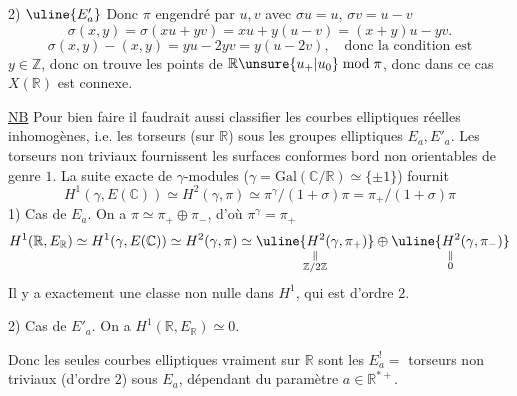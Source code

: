 2) $\uline{E'_a}$ Donc $\pi$ engendré par $u,v$ avec $\sigma u=u$, $\sigma v=u-v$
\[\sigma(x,y)=\sigma(xu+yv)=xu+y(u-v)=(x+y)u-yv.\]
\[\sigma(x,y)-(x,y)=yu-2yv=y(u-2v),\quad\text{donc la condition est}\]
$y\in\mathbb Z$, donc on trouve  les points de $\mathbb R\unsure{u_+|u_0}\bmod\pi$,
donc dans ce cas $X(\mathbb R)$ est connexe.

\uline{NB} Pour bien faire il faudrait aussi classifier les
courbes elliptiques réelles inhomogènes, i.e. les
torseurs (sur $\mathbb R$) sous les  groupes elliptiques
$E_a,E'_a$. Les torseurs non triviaux fournissent les
surfaces conformes  bord non orientables de
genre $1$. La suite exacte de $\gamma$-modules ($\gamma=\mathrm{Gal}(\mathbb C/\mathbb R)\simeq\{\pm1\}$)
fournit
\[
H^1(\gamma,E(\mathbb C))\simeq H^2(\gamma,\pi)\simeq
\pi^\gamma/(1+\sigma)\pi=\pi_+/(1+\sigma)\pi
\]
1) Cas de $E_a$. On a $\pi\simeq\pi_+\oplus\pi_-$, d'où $\pi^\gamma=\pi_+$
\[
H^1(\mathbb R,E_{\mathbb R})\simeq H^1(\gamma,E(\mathbb C))\simeq H^2(\gamma,\pi)
\simeq\underset{\substack{\Vert\\\mathbb Z/2\mathbb Z}}{\uline{H^2(\gamma,\pi_+)}}
\oplus\underset{\substack{\Vert\\0}}{\uline{H^2(\gamma,\pi_-)}}
\]
Il y a exactement une classe non
nulle dans $H^1$, qui est d'ordre $2$.

2) Cas de $E'_a$. On a $H^1(\mathbb R,E_{\mathbb R})\simeq0$.

Donc les seules courbes elliptiques vraiment
 sur $\mathbb R$ sont les $E_a^!=$ torseurs non
triviaux (d'ordre $2$) sous $E_a$, dépendant du
paramètre $a\in\mathbb R^{*+}$.
